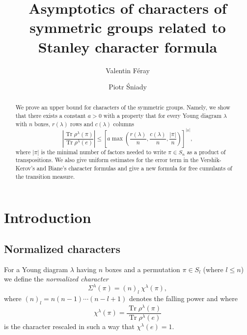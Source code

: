 \documentclass[12pt]{amsart}
\author{Valentin F\'eray}
\author{Piotr \'Sniady}
\title[Asymptotics of characters of symmetric groups]%
{Asymptotics of characters of symmetric groups related to Stanley character formula}
\theoremstyle{plain}
\theoremstyle{remark}
\DeclareMathOperator{\Tr}{Tr}
\begin{document}
\begin{abstract}
We prove an upper bound for characters of the symmetric groups.
Namely, we show that 
there exists a constant $a>0$ with a property that for every Young diagram
$\lambda$
with $n$ boxes, $r(\lambda)$ rows and $c(\lambda)$ columns
$$ \left| \frac{\Tr \rho^{\lambda}(\pi)}{\Tr \rho^{\lambda}(e)} \right|  \leq 
\left[a
\max\left(\frac{r(\lambda)}{n},\frac{c(\lambda)}{n},\frac{|\pi|}{n}
\right)\right]^{|\pi|}, $$
where $|\pi|$ is the minimal number of factors needed to write $\pi\in S_n$ as a product of 
transpositions. 
We also give uniform estimates for the error term in the Vershik-Kerov's and
Biane's character formulas and give a new formula for free cumulants of the
transition measure.
\end{abstract}


\maketitle


\section{Introduction}



\subsection{Normalized characters}
\label{subsec:normalized-characters}
For a Young diagram $\lambda$ having $n$ boxes and a permutation $\pi\in S_l$ (where
$l\leq n$) we define the \emph{normalized character}
\begin{equation} 
\label{eq:sigma}
\Sigma^{\lambda}(\pi)= (n)_{l}\ \chi^{\lambda}(\pi),
\end{equation}
where $(n)_l=n (n-1) \cdots (n-l+1)$ denotes the falling power and where
$$ \chi^{\lambda}(\pi) = \frac{\Tr \rho^{\lambda}(\pi)}{\Tr \rho^{\lambda}(e)}$$
is the character rescaled in such a way that $\chi^{\lambda}(e)=1$.

\end{document}
